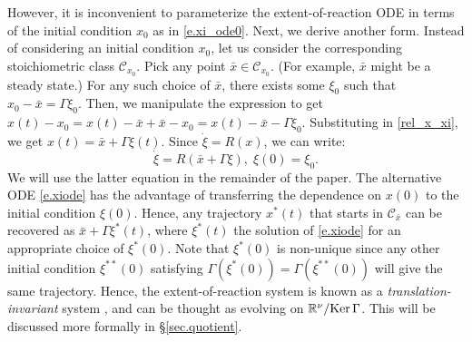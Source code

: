 \documentclass[onefignum,onetabnum]{siamonline220329}
\newcommand\bx{{\bar x}}
\newcommand{\Cs}{\mathscr C}
\renewcommand{\ker}{{\mathop{\rm Ker\,}}}
\newcommand{\kerGamma}{\ker \Gamma}
\begin{document}
However, it is inconvenient to parameterize the extent-of-reaction ODE in terms of the initial condition $x_0$ as in \eqref{e.xi_ode0}.
Next, we derive another form.  Instead of considering an initial condition $x_0$, let us consider the corresponding stoichiometric class $\Cs_{x_0}$. 
Pick any point $\bx \in \Cs_{x_0}$. (For example, $\bx$ might be a steady state.) For any such choice of $\bx$, there exists some $\xi_0$ such that $x_0 - \bx = \Gamma \xi_0$.  Then, we manipulate the expression to get $x(t)-x_0=x(t)-\bx+\bx-x_0= x(t)-\bx - \Gamma \xi_0$. Substituting in \eqref{rel_x_xi}, we get $x(t)=\bx+\Gamma\xi(t)$. Since $\dot\xi=R(x)$, we can write:
\begin{equation}
\label{e.xiode} 
\dot\xi = R(\bx + \Gamma \xi),\; \xi(0)=\xi_0.
\end{equation}
We will use the latter equation in the remainder of the paper.
The alternative ODE \eqref{e.xiode} has the advantage of transferring the 
dependence on $x(0)$ to the initial condition $\xi(0)$. Hence, any trajectory $x^*(t)$ that starts in $\Cs_\bx$ can be recovered as $\bx+\Gamma \xi^* (t)$, where $\xi^*(t)$ the solution of \eqref{e.xiode} for an appropriate choice of $\xi^*(0)$. Note that $\xi^*(0)$ is non-unique since any other initial condition $\xi^{**}(0)$ satisfying $\Gamma(\xi^*(0))=\Gamma(\xi^{**}(0))$ will give the same trajectory. Hence, the extent-of-reaction system is known as a \emph{translation-invariant} system \cite{angeli08}, and can be thought as evolving on $\mathbb R^\nu/\kerGamma$.  This will be discussed more formally in \S \ref{sec.quotient}.
 
\end{document}
